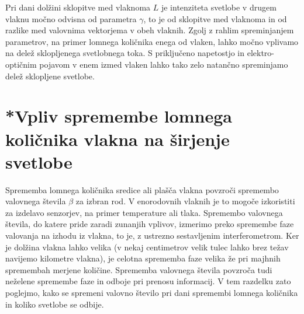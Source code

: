 \begin{remark}
 Pri dani dolžini sklopitve med vlaknoma $L$ je intenziteta svetlobe v drugem vlaknu močno odvisna od
 parametra $\gamma$, to je od sklopitve med vlaknoma in od razlike med valovnima vektorjema 
 v obeh vlaknih. Zgolj z rahlim spreminjanjem parametrov, na primer lomnega količnika enega od vlaken,
 lahko močno vplivamo na delež sklopljenega svetlobnega toka. S priključeno napetostjo in elektro-optičnim
 pojavom v enem izmed vlaken lahko tako zelo natančno spreminjamo delež sklopljene svetlobe. 
\end{remark}

\section{*Vpliv spremembe lomnega količnika vlakna na širjenje svetlobe}

Sprememba lomnega količnika sredice ali plašča vlakna povzroči spremembo
valovnega števila $\beta$ za izbran rod. V enorodovnih vlaknih je to
mogoče izkoristiti za izdelavo senzorjev, na primer temperature ali
tlaka. Spremembo valovnega števila, do katere pride zaradi zunanjih vplivov,
izmerimo preko spremembe faze valovanja na izhodu iz vlakna, to je,
z ustrezno sestavljenim interferometrom. Ker je dolžina vlakna lahko
velika (v nekaj centimetrov velik tulec lahko brez težav navijemo
kilometre vlakna), je celotna sprememba faze velika že pri majhnih
spremembah merjene količine. Sprememba valovnega števila povzroča
tudi neželene spremembe faze in odboje pri prenosu informacij.
V tem razdelku zato poglejmo, kako se spremeni valovno število pri
dani spremembi lomnega količnika in koliko svetlobe se odbije.

